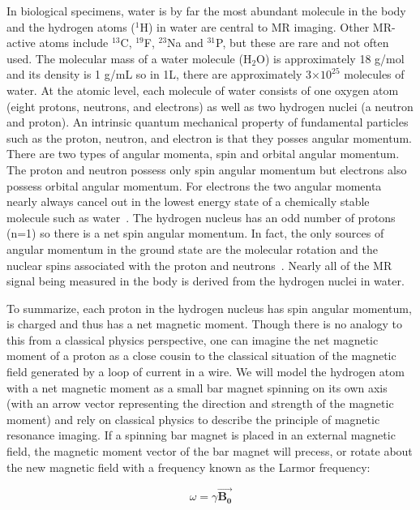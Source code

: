 In biological specimens, water is by far the most abundant molecule in the body and the hydrogen atoms ($^{1}$H) in water are central to MR imaging.
Other MR-active atoms include $^{13}$C, $^{19}$F, $^{23}$Na and $^{31}$P, but these are rare and not often used.
The molecular mass of a water molecule (H$_2$O) is approximately 18 g/mol and its density is 1 g/mL so in 1L, there are approximately 3$\times10^{25}$ molecules of water.
At the atomic level, each molecule of water consists of one oxygen atom (eight protons, neutrons, and electrons) as well as two hydrogen nuclei (a neutron and proton).
An intrinsic quantum mechanical property of fundamental particles such as the proton, neutron, and electron is that they posses angular momentum.
There are two types of angular momenta, spin and orbital angular momentum.
The proton and neutron possess only spin angular momentum but electrons also possess orbital angular momentum.
For electrons the two angular momenta nearly always cancel out in the lowest energy state of a chemically stable molecule such as water~\cite{Levitt:2001wo}.
The hydrogen nucleus has an odd number of protons (n=1) so there is a net spin angular momentum.
In fact, the only sources of angular momentum in the ground state are the molecular rotation and the nuclear spins associated with the proton and neutrons~\cite{Levitt:2001wo}.
Nearly all of the MR signal being measured in the body is derived from the hydrogen nuclei in water.

To summarize, each proton in the hydrogen nucleus has spin angular momentum, is charged and thus has a net magnetic moment.
Though there is no analogy to this from a classical physics perspective, one can imagine the net magnetic moment of a proton as a close cousin to the classical situation of the magnetic field generated by a loop of current in a wire.
We will model the hydrogen atom with a net magnetic moment as a small bar magnet spinning on its own axis (with an arrow vector representing the direction and strength of the magnetic moment) and rely on classical physics to describe the principle of magnetic resonance imaging. 
If a spinning bar magnet is placed in an external magnetic field, the magnetic moment vector of the bar magnet will precess, or rotate about the new magnetic field with a frequency known as the Larmor frequency:

\begin{equation}
	\omega = \gamma \vec{\mathbf{B_0}}
\end{equation}

